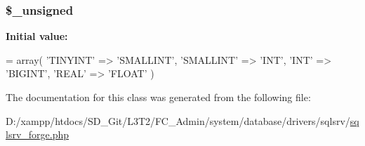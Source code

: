 \subsubsection[{\$\+\_\+unsigned}]{\setlength{\rightskip}{0pt plus 5cm}\$\+\_\+unsigned\hspace{0.3cm}{\ttfamily [protected]}}\label{class_c_i___d_b__sqlsrv__forge_aae977ae6d61fa183f0b25422b6ddc31c}
{\bfseries Initial value\+:}
\begin{DoxyCode}
= array(
        \textcolor{stringliteral}{'TINYINT'}   => \textcolor{stringliteral}{'SMALLINT'},
        \textcolor{stringliteral}{'SMALLINT'}  => \textcolor{stringliteral}{'INT'},
        \textcolor{stringliteral}{'INT'}       => \textcolor{stringliteral}{'BIGINT'},
        \textcolor{stringliteral}{'REAL'}      => \textcolor{stringliteral}{'FLOAT'}
    )
\end{DoxyCode}


The documentation for this class was generated from the following file\+:\begin{DoxyCompactItemize}
\item 
D\+:/xampp/htdocs/\+S\+D\+\_\+\+Git/\+L3\+T2/\+F\+C\+\_\+\+Admin/system/database/drivers/sqlsrv/\hyperlink{sqlsrv__forge_8php}{sqlsrv\+\_\+forge.\+php}\end{DoxyCompactItemize}

